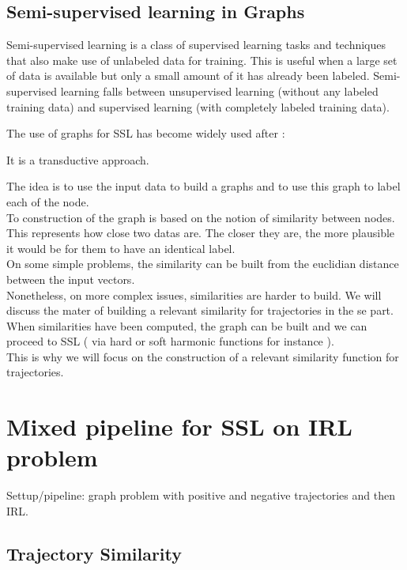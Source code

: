 \documentclass{article}
\begin{document}
\subsection{Semi-supervised learning in Graphs}


Semi-supervised learning is a class of supervised learning tasks and techniques that also make use of unlabeled data for training. This is useful when a large set of data is available but only a small amount of it has already been labeled. Semi-supervised learning falls between unsupervised learning (without any labeled training data) and supervised learning (with completely labeled training data).

The use of graphs for SSL has become widely used after : \cite{Zhu03}

It is a transductive approach.

The idea is to use the input data to build a graphs and to use this graph to label each of the node. \\
To construction of the graph is based on the notion of similarity between nodes.\\ This represents how close two datas are. The closer they are, the more plausible it would be for them to have an identical label.\\
On some simple problems, the similarity can be built from the euclidian distance between the input vectors.\\
Nonetheless, on more complex issues, similarities are harder to build. We will discuss the mater of building a relevant similarity for trajectories in the se part.
When similarities have been computed, the graph can be built and we can proceed to SSL ( via hard or soft harmonic functions for instance ).\\
This is why we will focus on the construction of a relevant similarity function for trajectories.

\section{Mixed pipeline for SSL on IRL problem \label{sec:combine}}

Settup/pipeline: graph problem with positive and negative trajectories and then IRL.


\subsection{Trajectory Similarity}
\end{document}
